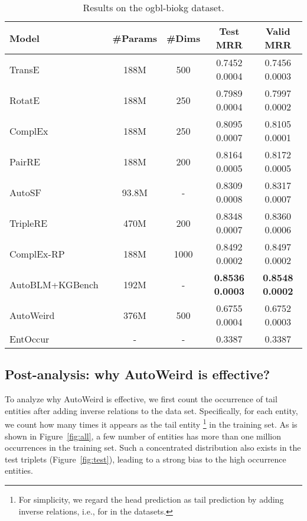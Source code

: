 \documentclass{article}
\begin{document}
\begin{table*}[!tp]
	\caption{Results on the ogbl-biokg dataset.}
	\label{tab:biokg}
	\centering
	\begin{tabular}{lcccc}
		\toprule
		Model & \#Params & \#Dims & Test MRR & Valid MRR \\
		\midrule
		TransE~\cite{bordes2013translating} & 188M & 500 & 0.7452  0.0004 & 0.7456  0.0003 \\
		RotatE~\cite{sun2019rotate} & 188M & 250 & 0.7989  0.0004 & 0.7997  0.0002 \\
		ComplEx~\cite{complex} & 188M & 250 & 0.8095  0.0007 & 0.8105  0.0001 \\
		PairRE~\cite{chao2020pairre} & 188M & 200 & 0.8164  0.0005 & 0.8172  0.0005 \\
		AutoSF~\cite{zhang2020autosf} & 93.8M & - & 0.8309  0.0008 & 0.8317  0.0007 \\
		TripleRE~\cite{long2021triplere} & 470M & 200 & 0.8348  0.0007 & 0.8360  0.0006 \\
		ComplEx-RP~\cite{chen2021rp} & 188M & 1000 & {0.8492  0.0002} & {0.8497  0.0002} \\
		AutoBLM+KGBench~\cite{zhang2022bilinear} & 192M & - & \textbf{0.8536  0.0003}  & \textbf{0.8548  0.0002} \\
		\midrule
		AutoWeird & 376M & 500 & 0.6755  0.0004 & 0.6752  0.0003 \\
		\midrule 
		EntOccur & - & - & 0.3387 & 0.3387 \\
		\bottomrule
	\end{tabular}
\end{table*}

\subsection{Post-analysis: why AutoWeird is effective?}
\label{sec:postans}

To analyze why AutoWeird is effective,
we first count the occurrence of tail entities 
after adding inverse relations to the data set. 
Specifically,
for each entity,
we count how many times it appears as the 
tail entity
\footnote{ For simplicity, we regard the head prediction as tail prediction
	by adding inverse relations,
	i.e.,  for  in the datasets.}
in the training set. 
As is shown in Figure~\ref{fig:all},
a few number of entities has more than one million occurrences in the training set.
Such a concentrated distribution also exists in the test triplets (Figure~\ref{fig:test}),
leading to a strong bias to the high occurrence entities.
\end{document}
